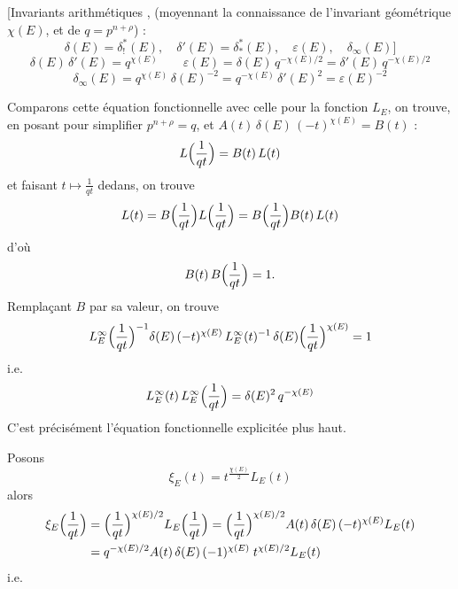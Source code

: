 \documentclass[11pt,a4paper]{article}
\begin{document}
[Invariants arithmétiques , (moyennant la
connaissance de l'invariant géométrique $\chi(E)$, et de $q = p^{n+\rho}$) :
\[
  \delta(E) = \delta^{*}_{!}(E) , \quad
  \delta'(E) = \delta^{*}_{*}(E) , \quad
  \varepsilon(E) , \quad
  \delta_{\infty}(E) ]
\]
\[
  \boxed{\delta(E)\,\delta'(E) = q^{\chi(E)}}
  \qquad
  \boxed{\varepsilon(E) = \delta(E)\, q^{-\chi(E)/2} = \delta'(E)\, q^{-\chi(E)/2}}
\]
\[
  \boxed{\delta_{\infty}(E) = q^{\chi(E)}\, \delta(E)^{-2} = q^{-\chi(E)}\, \delta'(E)^{2}
    = \varepsilon(E)^{-2}}
\]

Comparons cette équation fonctionnelle avec celle pour la fonction $L_E$, on
trouve, en  posant pour simplifier $p^{n+\rho} = q$, et
$A(t)\, \delta(E)\, (-t)^{\chi(E)} = B(t)$ :
\[
  L\Bigl(\frac{1}{qt}\Bigr) = B(t)\, L(t)
\]
et faisant $t \mapsto \frac{1}{qt}$ dedans, on trouve
\[
  L(t) = B\Bigl(\frac{1}{qt}\Bigr) L\Bigl(\frac{1}{qt}\Bigr)
  = B\Bigl(\frac{1}{qt}\Bigr) B(t)\, L(t)
\]
d'où
\[
  B(t)\, B\Bigl(\frac{1}{qt}\Bigr) = 1 .
\]
Remplaçant $B$ par sa valeur, on trouve
\[
  L^{\infty}_E\Bigl(\frac{1}{qt}\Bigr)^{-1} \delta(E)\, (-t)^{\chi(E)}\,
  L^{\infty}_E(t)^{-1}\, \delta(E) \Bigl(\frac{1}{qt}\Bigr)^{\chi(E)} = 1
\]
i.e.
\[
  L^{\infty}_E(t)\, L^{\infty}_E\Bigl(\frac{1}{qt}\Bigr) = \delta(E)^2\, q^{-\chi(E)}
\]
C'est précisément l'équation fonctionnelle explicitée plus haut.

Posons
\[
  \xi_E(t) = t^{\frac{\chi(E)}{2}} L_E(t)
\]
alors
\[
  \begin{aligned}
    \xi_E\Bigl(\frac{1}{qt}\Bigr)
      &= \Bigl(\frac{1}{qt}\Bigr)^{\chi(E)/2} L_E\Bigl(\frac{1}{qt}\Bigr)
       = \Bigl(\frac{1}{qt}\Bigr)^{\chi(E)/2} A(t)\, \delta(E)\, (-t)^{\chi(E)} L_E(t) \\
      &= q^{-\chi(E)/2} A(t)\, \delta(E)\, (-1)^{\chi(E)}\; t^{\chi(E)/2} L_E(t)
  \end{aligned}
\]
i.e.
\end{document}
